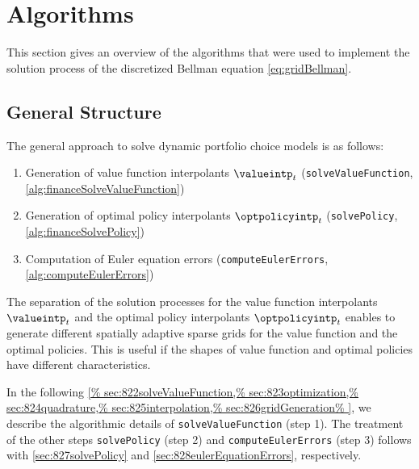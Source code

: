 \section{Algorithms}
\label{sec:82algorithms}

This section gives an overview of the algorithms that
were used to implement the solution process of
the discretized Bellman equation \eqref{eq:gridBellman}.



\subsection{General Structure}
\label{sec:821generalStructure}

The general approach to solve dynamic portfolio choice models is as follows:
\begin{enumerate}
  \item
  Generation of value function interpolants $\valueintp_t$
  (\texttt{solveValueFunction}, \cref{alg:financeSolveValueFunction})
  
  \item
  Generation of optimal policy interpolants $\optpolicyintp_t$
  (\texttt{solvePolicy}, \cref{alg:financeSolvePolicy})
  
  \item
  Computation of Euler equation errors
  (\texttt{computeEulerErrors}, \cref{alg:computeEulerErrors})
\end{enumerate}
The separation of the solution processes for
the value function interpolants $\valueintp_t$
and the optimal policy interpolants $\optpolicyintp_t$
enables to generate different spatially adaptive sparse grids
for the value function and the optimal policies.
This is useful if the shapes of value function and optimal policies
have different characteristics.

In the following \cref{%
  sec:822solveValueFunction,%
  sec:823optimization,%
  sec:824quadrature,%
  sec:825interpolation,%
  sec:826gridGeneration%
}, we describe the algorithmic details of
\texttt{solveValueFunction} (step 1).
The treatment of the other steps \texttt{solvePolicy} (step 2) and
\texttt{computeEulerErrors} (step 3) follows with
\cref{sec:827solvePolicy} and \cref{sec:828eulerEquationErrors},
respectively.


